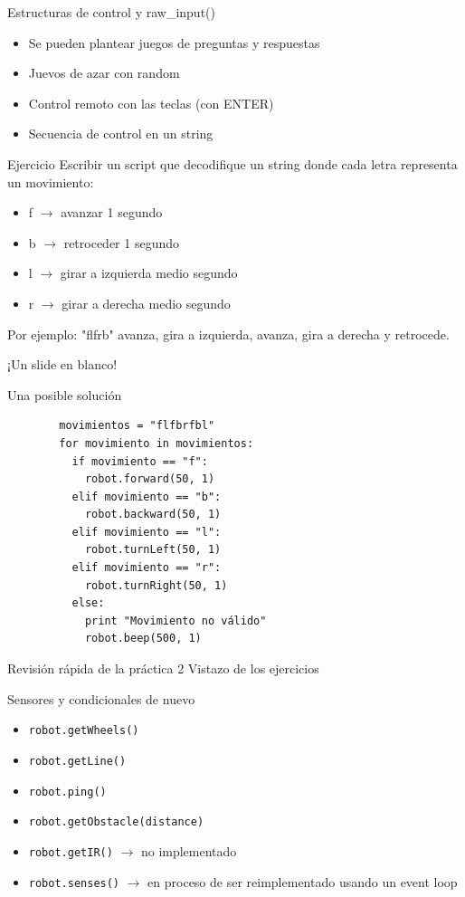 \documentclass{beamer}[10]
\begin{document}
\begin{frame}{Estructuras de control y raw\_input()}
	\begin{itemize}[<+->]
		\item Se pueden plantear juegos de preguntas y respuestas
		\item Juevos de azar con random
		\item Control remoto con las teclas (con ENTER)
		\item Secuencia de control en un string
	\end{itemize}
\end{frame}
\begin{frame}{Ejercicio}
	Escribir un script que decodifique un string donde cada letra representa un movimiento:
	\begin{itemize}
		\item f $\rightarrow$ avanzar 1 segundo
		\item b $\rightarrow$ retroceder 1 segundo
		\item l $\rightarrow$ girar a izquierda medio segundo
		\item r $\rightarrow$ girar a derecha medio segundo
	\end{itemize}\pause
	Por ejemplo: "flfrb" avanza, gira a izquierda, avanza, gira a derecha y retrocede.
\end{frame}
\begin{frame}
	\begin{center}
		{\huge ¡Un slide en blanco!}
	\end{center}
\end{frame}
\begin{frame}[fragile]{Una posible solución}
	\begin{block}{}
		\begin{lstlisting}
		movimientos = "flfbrfbl"
		for movimiento in movimientos:
		  if movimiento == "f":
		    robot.forward(50, 1)
		  elif movimiento == "b":
		    robot.backward(50, 1)
		  elif movimiento == "l":
		    robot.turnLeft(50, 1)
		  elif movimiento == "r":
		    robot.turnRight(50, 1)
		  else:
		    print "Movimiento no válido"
		    robot.beep(500, 1)
		\end{lstlisting}
	\end{block}
\end{frame}
\begin{frame}{Revisión rápida de la práctica 2}
Vistazo de los ejercicios
\end{frame}
\begin{frame}[fragile]{Sensores y condicionales de nuevo}
	\begin{itemize}[<+->]
		\item \verb+robot.getWheels()+
		\item \verb+robot.getLine()+
		\item \verb+robot.ping()+
		\item \verb+robot.getObstacle(distance)+
		\item \verb+robot.getIR()+ $\rightarrow$ no implementado
		\item \verb+robot.senses()+ $\rightarrow$ en proceso de ser reimplementado usando un event loop
	\end{itemize}
\end{frame}
\end{document}
